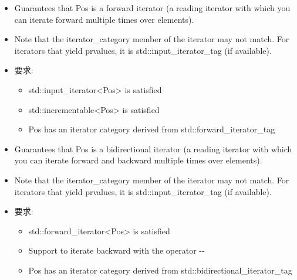 \begin{itemize}
\item
Guarantees that Pos is a forward iterator (a reading iterator with which you can iterate forward multiple times over elements).

\item
Note that the iterator\_category member of the iterator may not match. For iterators that yield prvalues, it is std::input\_iterator\_tag (if available).

\item
要求:
\begin{itemize}
\item
std::input\_iterator<Pos> is satisfied

\item
std::incrementable<Pos> is satisfied

\item
Pos has an iterator category derived from std::forward\_iterator\_tag
\end{itemize}
\end{itemize}


\begin{itemize}
\item
Guarantees that Pos is a bidirectional iterator (a reading iterator with which you can iterate forward and backward multiple times over elements).

\item
Note that the iterator\_category member of the iterator may not match. For iterators that yield prvalues, it is std::input\_iterator\_tag (if available).

\item
要求:
\begin{itemize}
\item
std::forward\_iterator<Pos> is satisfied

\item
Support to iterate backward with the operator -{}-

\item
Pos has an iterator category derived from std::bidirectional\_iterator\_tag
\end{itemize}
\end{itemize}


